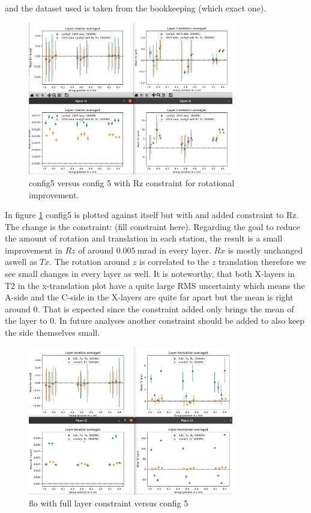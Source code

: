 and the dataset used is taken from the bookkeeping (which exact one).

\begin{figure}
  \centering
  \includegraphics[width=0.8\textwidth]{plots/august_13/2019_c5_old_vs_withRz_MU.png}
  \caption{config5 versus config 5 with Rz constraint for rotational improvement.}
  \label{fig:withRz}
\end{figure}

In figure \ref{fig:withRz} config5 is plotted against itself but with and added constraint to Rz.
The change is the constraint: (fill constraint here).
Regarding the goal to reduce the amount of rotation and translation in each station,
the result is a small improvement in $Rz$ of around $\SI{0.005}{\milli\radian}$ in every layer. $Rx$ is mostly unchanged aswell as $Tx$. The rotation around $z$ is correlated to the $z$ translation therefore we see small changes in every layer as well.
It is noteworthy, that both X-layers in T2 in the x-translation plot have a quite large RMS uncertainty which means the A-side and the C-side in the X-layers are quite far apart but the mean is right around 0. That is expected since the constraint added only brings the mean of the layer to 0. In future analyses another constraint should be added to also keep the side themselves small.

\begin{figure}
  \centering
  \includegraphics[width=0.8\textwidth]{plots/august_13/combi5_layers_averaged.png}
  \caption{flo with full layer constraint versus config 5}
  \label{fig:floFullL_c5}
\end{figure}

